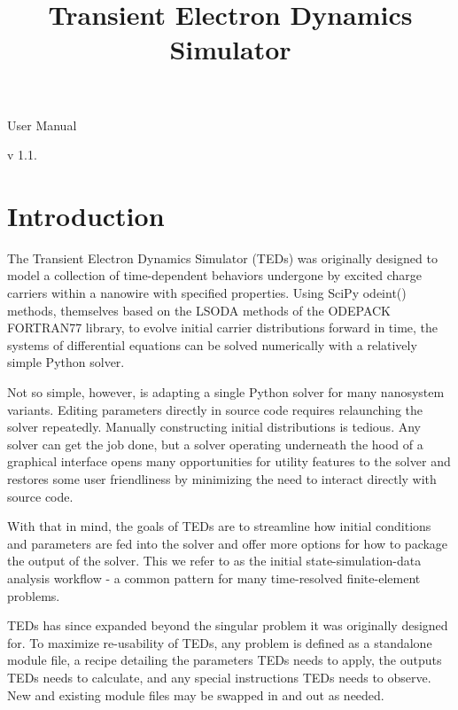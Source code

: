 \documentclass[11pt,letterpaper,titlepage]{article}
\title{Transient Electron Dynamics Simulator}
\begin{document}
	\begin{titlepage}
		\begin{center}
			\makeatletter
			{\huge \@title}
			\begin{large}
				\par User Manual
				\par v 1.1.
			\end{large}
		\end{center}
		\makeatother
	\end{titlepage}
	
	\tableofcontents
	\newpage
	\section{Introduction}
		\par
		The Transient Electron Dynamics Simulator (TEDs) was originally designed to model a collection of time-dependent behaviors undergone by excited charge carriers within a nanowire with specified properties. Using SciPy odeint() methods, themselves based on the LSODA methods of the ODEPACK FORTRAN77 library, to evolve initial carrier distributions forward in time, the systems of differential equations can be solved numerically with a relatively simple Python solver.
		
		\par
		Not so simple, however, is adapting a single Python solver for many nanosystem variants. Editing parameters directly in source code requires relaunching the solver repeatedly. Manually constructing initial distributions is tedious. Any solver can get the job done, but a solver operating underneath the hood of a graphical interface opens many opportunities for utility features to the solver and restores some user friendliness by minimizing the need to interact directly with source code.
		
		\par
		With that in mind, the goals of TEDs are to streamline how initial conditions and parameters are fed into the solver and offer more options for how to package the output of the solver. This we refer to as the initial state-simulation-data analysis workflow - a common pattern for many time-resolved finite-element problems.
		
		\par
		TEDs has since expanded beyond the singular problem it was originally designed for. To maximize re-usability of TEDs, any problem is defined as a standalone module file, a recipe detailing the parameters TEDs needs to apply, the outputs TEDs needs to calculate, and any special instructions TEDs needs to observe. New and existing module files may be swapped in and out as needed.
		
\end{document}
